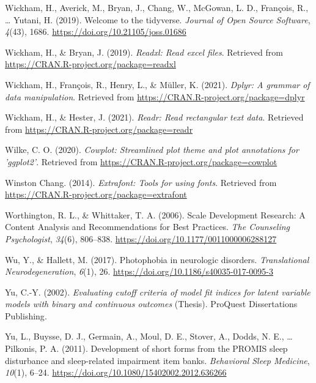 \documentclass[
  english,
  man]{apa6}
\newlength{\cslhangindent}
\newlength{\cslentryspacingunit} %
\newenvironment{CSLReferences}[2] %
 {%
  \setlength{\parindent}{0pt}
  \ifodd #1
  \let\oldpar\par
  \def\par{\hangindent=\cslhangindent\oldpar}
  \fi
  \setlength{\parskip}{#2\cslentryspacingunit}
 }%
 {}
\begin{document}
\begin{CSLReferences}{1}{0}
\leavevmode{}%
Wickham, H., Averick, M., Bryan, J., Chang, W., McGowan, L. D., François, R., \ldots{} Yutani, H. (2019). Welcome to the {tidyverse}. \emph{Journal of Open Source Software}, \emph{4}(43), 1686. \url{https://doi.org/10.21105/joss.01686}

\leavevmode{}%
Wickham, H., \& Bryan, J. (2019). \emph{Readxl: Read excel files}. Retrieved from \url{https://CRAN.R-project.org/package=readxl}

\leavevmode{}%
Wickham, H., François, R., Henry, L., \& Müller, K. (2021). \emph{Dplyr: A grammar of data manipulation}. Retrieved from \url{https://CRAN.R-project.org/package=dplyr}

\leavevmode{}%
Wickham, H., \& Hester, J. (2021). \emph{Readr: Read rectangular text data}. Retrieved from \url{https://CRAN.R-project.org/package=readr}

\leavevmode{}%
Wilke, C. O. (2020). \emph{Cowplot: Streamlined plot theme and plot annotations for 'ggplot2'}. Retrieved from \url{https://CRAN.R-project.org/package=cowplot}

\leavevmode{}%
Winston Chang. (2014). \emph{Extrafont: Tools for using fonts}. Retrieved from \url{https://CRAN.R-project.org/package=extrafont}

\leavevmode{}%
Worthington, R. L., \& Whittaker, T. A. (2006). Scale {Development Research}: {A Content Analysis} and {Recommendations} for {Best Practices}. \emph{The Counseling Psychologist}, \emph{34}(6), 806--838. \url{https://doi.org/10.1177/0011000006288127}

\leavevmode{}%
Wu, Y., \& Hallett, M. (2017). Photophobia in neurologic disorders. \emph{Translational Neurodegeneration}, \emph{6}(1), 26. \url{https://doi.org/10.1186/s40035-017-0095-3}

\leavevmode{}%
Yu, C.-Y. (2002). \emph{Evaluating cutoff criteria of model fit indices for latent variable models with binary and continuous outcomes} (Thesis). {ProQuest Dissertations Publishing}.

\leavevmode{}%
Yu, L., Buysse, D. J., Germain, A., Moul, D. E., Stover, A., Dodds, N. E., \ldots{} Pilkonis, P. A. (2011). Development of short forms from the PROMIS{\texttrademark} sleep disturbance and sleep-related impairment item banks. \emph{Behavioral Sleep Medicine}, \emph{10}(1), 6--24. \url{https://doi.org/10.1080/15402002.2012.636266}


\end{CSLReferences}
\end{document}
